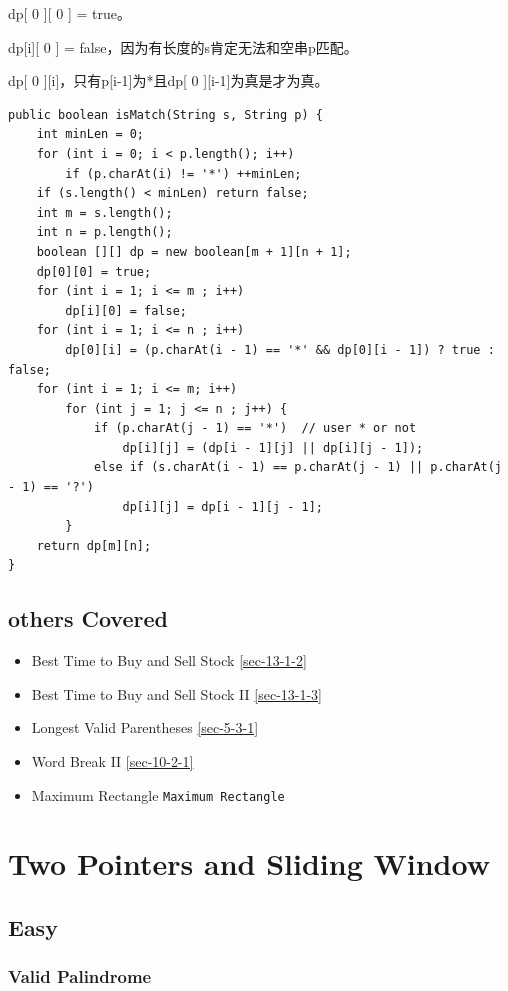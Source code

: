 \documentclass[12pt]{book}
\begin{document}
\begin{enumerate}
dp[ 0 ][ 0 ] = true。

dp[i][ 0 ] = false，因为有长度的s肯定无法和空串p匹配。

dp[ 0 ][i]，只有p[i-1]为*且dp[ 0 ][i-1]为真是才为真。

\lstset{language=java,label= ,caption= ,numbers=none}
\begin{lstlisting}
public boolean isMatch(String s, String p) {
    int minLen = 0;
    for (int i = 0; i < p.length(); i++) 
        if (p.charAt(i) != '*') ++minLen;
    if (s.length() < minLen) return false;
    int m = s.length();
    int n = p.length();
    boolean [][] dp = new boolean[m + 1][n + 1];
    dp[0][0] = true;
    for (int i = 1; i <= m ; i++) 
        dp[i][0] = false;
    for (int i = 1; i <= n ; i++) 
        dp[0][i] = (p.charAt(i - 1) == '*' && dp[0][i - 1]) ? true : false;
    for (int i = 1; i <= m; i++) 
        for (int j = 1; j <= n ; j++) {
            if (p.charAt(j - 1) == '*')  // user * or not
                dp[i][j] = (dp[i - 1][j] || dp[i][j - 1]);
            else if (s.charAt(i - 1) == p.charAt(j - 1) || p.charAt(j - 1) == '?')
                dp[i][j] = dp[i - 1][j - 1];
        }
    return dp[m][n];
}
\end{lstlisting}
\end{enumerate}

\section{others Covered}
\label{sec-14-4}
\begin{itemize}
\item Best Time to Buy and Sell Stock
\ref{sec-13-1-2}
\item Best Time to Buy and Sell Stock II
\ref{sec-13-1-3}
\item Longest Valid Parentheses
\ref{sec-5-3-1}
\item Word Break II
\ref{sec-10-2-1}
\item Maximum Rectangle
\texttt{Maximum Rectangle}
\end{itemize}

\chapter{Two Pointers and Sliding Window}
\label{sec-15}
\section{Easy}
\label{sec-15-1}
\subsection{Valid Palindrome}
\label{sec-15-1-1}
\end{document}
